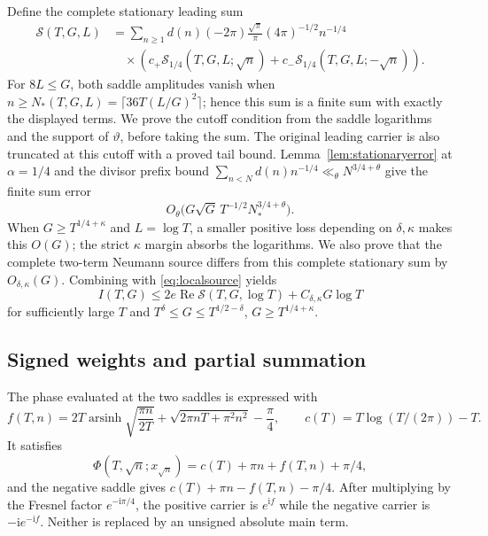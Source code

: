 \documentclass[11pt,a4paper]{article}
\numberwithin{equation}{section}
\theoremstyle{definition}
\newcommand{\ii}{\mathrm i}
\newcommand{\Rea}{\operatorname{Re}}
\newcommand{\arsinh}{\operatorname{arsinh}}
\begin{document}
Define the complete stationary leading sum
\begin{equation}\label{eq:stationarysum}
 \begin{split}
 \mathcal S(T,G,L)&=\sum_{n\ge1}d(n)(-2\pi)
 \frac{\sqrt\pi}\pi(4\pi)^{-1/2}n^{-1/4}\\
 &\quad\times\left(c_+\mathcal S_{1/4}(T,G,L;\sqrt n)
      +c_-\mathcal S_{1/4}(T,G,L;-\sqrt n)\right).
 \end{split}
\end{equation}
For $8L\le G$, both saddle amplitudes vanish when
$n\ge N_*(T,G,L)=\lceil36T(L/G)^2\rceil$; hence this sum is a finite sum
with exactly the displayed terms. We prove the cutoff condition from
the saddle logarithms and the support of $\vartheta$, before taking the sum.
The original leading carrier is also truncated at this cutoff with a proved
tail bound. Lemma~\ref{lem:stationaryerror} at $\alpha=1/4$ and the divisor
prefix bound $\sum_{n<N}d(n)n^{-1/4}\ll_\theta N^{3/4+\theta}$ give the
finite sum error
\[
 O_\theta\bigl(G\sqrt G\,T^{-1/2}N_*^{3/4+\theta}\bigr).
\]
When $G\ge T^{1/4+\kappa}$ and $L=\log T$, a smaller positive loss depending
on $\delta,\kappa$ makes this $O(G)$; the strict $\kappa$ margin absorbs the
logarithms. We also prove that the complete two-term Neumann source
differs from this complete stationary sum by $O_{\delta,\kappa}(G)$.
Combining with \eqref{eq:localsource} yields
\begin{equation}\label{eq:stationarylocal}
 I(T,G)\le2e\Rea\mathcal S(T,G,\log T)+C_{\delta,\kappa}G\log T
\end{equation}
for sufficiently large $T$ and
$T^\delta\le G\le T^{1/2-\delta}$, $G\ge T^{1/4+\kappa}$.

\subsection{Signed weights and partial summation}
The phase evaluated at the two saddles is expressed with
\[
 f(T,n)=2T\arsinh\sqrt{\frac{\pi n}{2T}}
       +\sqrt{2\pi nT+\pi^2n^2}-\frac\pi4,
 \qquad c(T)=T\log(T/(2\pi))-T.
\]
It satisfies
\[
 \Phi(T,\sqrt n;x_{\sqrt n})=c(T)+\pi n+f(T,n)+\pi/4,
\]
and the negative saddle gives $c(T)+\pi n-f(T,n)-\pi/4$.
After multiplying by the Fresnel factor $e^{-\ii\pi/4}$, the positive
carrier is $e^{\ii f}$ while the negative carrier is
$-\ii e^{-\ii f}$. Neither is replaced by an unsigned absolute main term.
\end{document}
